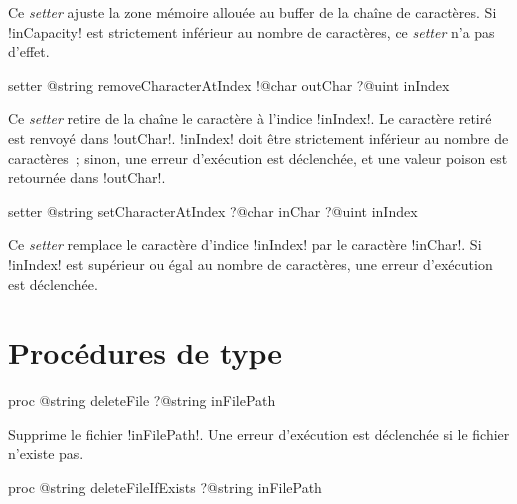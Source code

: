 Ce \emph{setter} ajuste la zone mémoire allouée au buffer de la chaîne de caractères. Si \ggst!inCapacity! est strictement inférieur au nombre de caractères, ce \emph{setter} n'a pas d'effet.







\begin{galgas3box}
setter @string removeCharacterAtIndex
   !@char outChar
   ?@uint inIndex
\end{galgas3box}


Ce \emph{setter} retire de la chaîne le caractère à l'indice \ggst!inIndex!. Le caractère retiré est renvoyé dans \ggst!outChar!. \ggst!inIndex! doit être strictement inférieur au nombre de caractères~; sinon, une erreur d'exécution est déclenchée, et une valeur poison est retournée dans \ggst!outChar!.







\begin{galgas3box}
setter @string setCharacterAtIndex
   ?@char inChar
   ?@uint inIndex
\end{galgas3box}


Ce \emph{setter} remplace le caractère d'indice \ggst!inIndex! par le caractère \ggst!inChar!. Si \ggst!inIndex! est supérieur ou égal au nombre de caractères, une erreur d'exécution est déclenchée.




\section{Procédures de type}




\begin{galgas3box}
proc @string deleteFile ?@string inFilePath
\end{galgas3box}

Supprime le fichier \ggst!inFilePath!. Une erreur d'exécution est déclenchée si le fichier n'existe pas.






\begin{galgas3box}
proc @string deleteFileIfExists ?@string inFilePath
\end{galgas3box}

